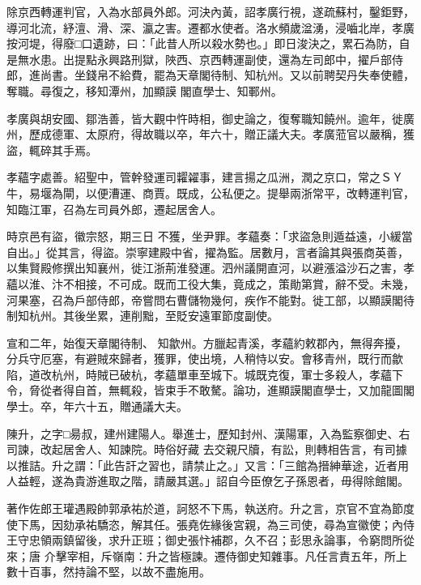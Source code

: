 \begin{pinyinscope}
 除京西轉運判官，入為水部員外郎。河決內黃，詔孝廣行視，遂疏蘇村，鑿鉅野，導河北流，紓澶、滑、深、瀛之害。遷都水使者。洛水頻歲湓湧，浸嚙北岸，孝廣按河堤，得廢□口遺跡，曰：「此昔人所以殺水勢也。」即日浚決之，累石為防，自是無水患。出提點永興路刑獄，陜西、京西轉運副使，還為左司郎中，擢戶部侍郎，進尚書。坐錢帛不給費，罷為天章閣待制、知杭州。又以前聘契丹失奉使體，奪職。尋復之，移知潭州，加顯謨
 閣直學士、知鄆州。



 孝廣與胡安國、鄒浩善，皆大觀中忤時相，御史論之，復奪職知饒州。逾年，徙廣州，歷成德軍、太原府，得故職以卒，年六十，贈正議大夫。孝廣蒞官以嚴稱，獲盜，輒碎其手焉。



 孝蘊字處善。紹聖中，管幹發運司糶糴事，建言揚之瓜洲，潤之京口，常之ＳＹ牛，易堰為閘，以便漕運、商賈。既成，公私便之。提舉兩浙常平，改轉運判官，知臨江軍，召為左司員外郎，遷起居舍人。



 時京邑有盜，徽宗怒，期三日
 不獲，坐尹罪。孝蘊奏：「求盜急則遁益遠，小緩當自出。」從其言，得盜。崇寧建殿中省，擢為監。居數月，言者論其與張商英善，以集賢殿修撰出知襄州，徙江浙荊淮發運。泗州議開直河，以避漲溢沙石之害，孝蘊以淮、汴不相接，不可成。既而工役大集，竟成之，策勛第賞，辭不受。未幾，河果塞，召為戶部侍郎，帝嘗問右曹儲物幾何，疾作不能對。徙工部，以顯謨閣待制知杭州。其後坐累，連削黜，至貶安遠軍節度副使。



 宣和二年，始復天章閣待制、
 知歙州。方臘起青溪，孝蘊約敕郡內，無得奔擾，分兵守厄塞，有避賊來歸者，獲罪，使出境，人稍恃以安。會移青州，既行而歙陷，道改杭州，時賊已破杭，孝蘊單車至城下。城既克復，軍士多殺人，孝蘊下令，脅從者得自首，無輒殺，皆束手不敢驁。論功，進顯謨閣直學士，又加龍圖閣學士。卒，年六十五，贈通議大夫。



 陳升，之字□昜叔，建州建陽人。舉進士，歷知封州、漢陽軍，入為監察御史、右司諫，改起居舍人、知諫院。時俗好藏
 去交親尺牘，有訟，則轉相告言，有司據以推詰。升之謂：「此告訐之習也，請禁止之。」又言：「三館為搢紳華途，近者用人益輕，遂為貴游進取之階，請嚴其選。」詔自今臣僚乞子孫恩者，毋得除館閣。



 著作佐郎王瓘遇殿帥郭承祐於道，訶怒不下馬，執送府。升之言，京官不宜為節度使下馬，因劾承祐驕恣，解其任。張堯佐緣後宮親，為三司使，尋為宣徽使；內侍王守忠領兩鎮留後，求升正班；御史張忭補郡，久不召；彭思永論事，令窮問所從來；唐
 介擊宰相，斥嶺南：升之皆極諫。遷侍御史知雜事。凡任言責五年，所上數十百事，然持論不堅，以故不盡施用。




\end{pinyinscope}
